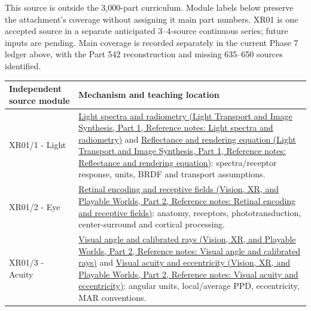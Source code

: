 \hypertarget{appendix-fd090d982a15-xr01---independent-seeing-and-representation-source}{}

This source is outside the 3,000-part curriculum. Module labels below preserve the attachment's coverage without assigning it main part numbers. XR01 is one accepted source in a separate anticipated 3--4-source continuous series; future inputs are pending. Main coverage is recorded separately in the current Phase 7 ledger above, with the Part 542 reconstruction and missing 635--650 sources identified.

{\def\LTcaptype{none} %
\begin{longtable}[]{@{}
  >{\raggedright\arraybackslash}p{}
  >{\raggedright\arraybackslash}p{}@{}}
\toprule\noalign{}
\begin{minipage}[b]{\linewidth}\raggedright
Independent source module
\end{minipage} & \begin{minipage}[b]{\linewidth}\raggedright
Mechanism and teaching location
\end{minipage} \\
\midrule\noalign{}
\endhead
\bottomrule\noalign{}
\endlastfoot
XR01/1 - Light & \href{../04-Light-Transport-and-Image-Synthesis-P01/main.pdf\#appendix-215c2570199b}{Light spectra and radiometry (Light Transport and Image Synthesis, Part 1, Reference notes: Light spectra and radiometry)} and \href{../04-Light-Transport-and-Image-Synthesis-P01/main.pdf\#appendix-96da0b153b77}{Reflectance and rendering equation (Light Transport and Image Synthesis, Part 1, Reference notes: Reflectance and rendering equation)}: spectra/receptor response, units, BRDF and transport assumptions. \\
XR01/2 - Eye & \href{../07-Vision-XR-and-Playable-Worlds-P02/main.pdf\#appendix-7281c15ac44a}{Retinal encoding and receptive fields (Vision, XR, and Playable Worlds, Part 2, Reference notes: Retinal encoding and receptive fields)}: anatomy, receptors, phototransduction, center-surround and cortical processing. \\
XR01/3 - Acuity & \href{../07-Vision-XR-and-Playable-Worlds-P02/main.pdf\#appendix-7d356c396d1a}{Visual angle and calibrated rays (Vision, XR, and Playable Worlds, Part 2, Reference notes: Visual angle and calibrated rays)} and \href{../07-Vision-XR-and-Playable-Worlds-P02/main.pdf\#appendix-b491fc48c54b}{Visual acuity and eccentricity (Vision, XR, and Playable Worlds, Part 2, Reference notes: Visual acuity and eccentricity)}: angular units, local/average PPD, eccentricity, MAR conventions. \\

\end{longtable}}
